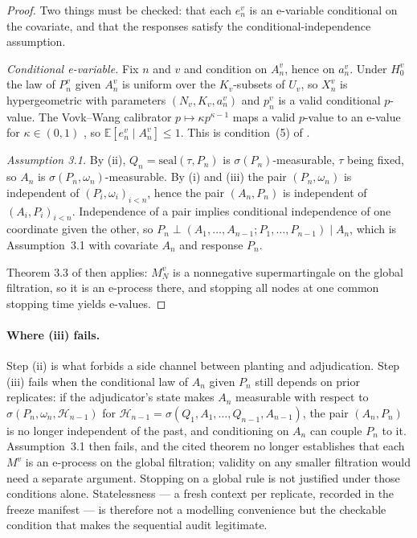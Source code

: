 \documentclass[10pt]{article}
\begin{document}
\begin{proof}
Two things must be checked: that each $e^v_n$ is an e-variable conditional on
the covariate, and that the responses satisfy the conditional-independence
assumption.

\emph{Conditional e-variable.} Fix $n$ and $v$ and condition on $A^v_n$, hence
on $a^v_n$. Under $H^v_0$ the law of $P^v_n$ given $A^v_n$ is uniform over the
$K_v$-subsets of $U_v$, so $X^v_n$ is hypergeometric with parameters
$(N_v,K_v,a^v_n)$ and $p^v_n$ is a valid conditional $p$-value. The Vovk--Wang
calibrator $p\mapsto\kappa p^{\kappa-1}$ maps a valid $p$-value to an e-value
for $\kappa\in(0,1)$ \cite{vovk2021evalues}, so
$\mathbb{E}[e^v_n\mid A^v_n]\le 1$. This is condition~(5) of
\cite{stoppedebh}.

\emph{Assumption 3.1.} By (ii), $Q_n=\mathrm{seal}(\tau,P_n)$ is
$\sigma(P_n)$-measurable, $\tau$ being fixed, so $A_n$ is
$\sigma(P_n,\omega_n)$-measurable. By (i) and (iii) the pair $(P_n,\omega_n)$
is independent of $(P_i,\omega_i)_{i<n}$, hence the pair $(A_n,P_n)$ is
independent of $(A_i,P_i)_{i<n}$. Independence of a pair implies conditional
independence of one coordinate given the other, so
$P_n\perp (A_1,\dots,A_{n-1};P_1,\dots,P_{n-1})\mid A_n$, which is
Assumption~3.1 with covariate $A_n$ and response $P_n$.

Theorem 3.3 of \cite{stoppedebh} then applies: $M^v_N$ is a nonnegative
supermartingale on the global filtration, so it is an e-process there, and
stopping all nodes at one common stopping time yields e-values.
\end{proof}

\paragraph{Where (iii) fails.} Step (ii) is what forbids a side channel between
planting and adjudication. Step (iii) fails when the conditional law of $A_n$
given $P_n$ still depends on prior replicates: if the adjudicator's state makes
$A_n$ measurable with respect to $\sigma(P_n,\omega_n,\mathcal H_{n-1})$ for
$\mathcal H_{n-1}=\sigma(Q_1,A_1,\dots,Q_{n-1},A_{n-1})$, the pair $(A_n,P_n)$
is no longer independent of the past, and conditioning on $A_n$ can couple $P_n$
to it. Assumption~3.1 then fails, and the cited theorem no longer establishes
that each $M^v$ is an e-process on the global filtration; validity on any
smaller filtration would need a separate argument. Stopping on a global rule is
not justified under those conditions alone. Statelessness --- a fresh context
per replicate, recorded in the freeze manifest --- is therefore not a modelling
convenience but the checkable condition that makes the sequential audit
legitimate.
\end{document}

